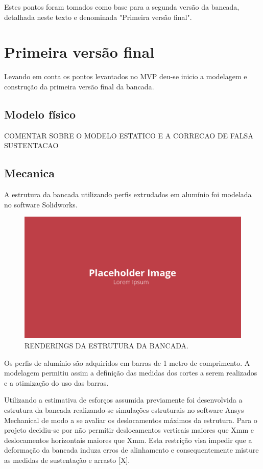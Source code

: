 Estes pontos foram tomados como base para a segunda versão da bancada, detalhada neste texto e denominada "Primeira versão final".

\section{Primeira versão final}

Levando em conta os pontos levantados no MVP deu-se inicio a modelagem e construção da primeira versão final da bancada.

\subsection{Modelo físico}

COMENTAR SOBRE O MODELO ESTATICO E A CORRECAO DE FALSA SUSTENTACAO

\subsection{Mecanica}

A estrutura da bancada utilizando perfis extrudados em alumínio foi modelada no software Solidworks.

\begin{figure}[!ht]
    \centering
    \includegraphics[width=.8\linewidth]{figuras/placeholder.png}
    \caption{RENDERINGS DA ESTRUTURA DA BANCADA\cite{autor}.}
    \label{fig:placeholder}
\end{figure}

Os perfis de alumínio são adquiridos em barras de 1 metro de comprimento. A modelagem permitiu assim a definição das medidas dos cortes a serem realizados e a otimização do uso das barras.

Utilizando a estimativa de esforços assumida previamente foi desenvolvida a estrutura da bancada realizando-se simulações estruturais no software Ansys Mechanical de modo a se avaliar os deslocamentos máximos da estrutura. Para o projeto decidiu-se por não permitir deslocamentos verticais maiores que Xmm e deslocamentos horizontais maiores que Xmm. Esta restrição visa impedir que a deformação da bancada induza erros de alinhamento e consequentemente misture as medidas de sustentação e arrasto [X].

